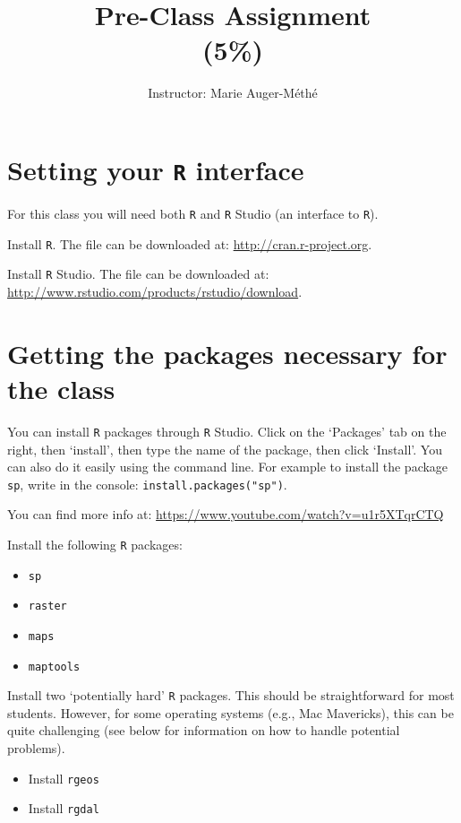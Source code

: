 \documentclass[11pt, oneside]{article}   	%
\title{Pre-Class Assignment \\ \large(5\%)}
\author{Instructor: Marie Auger-M\'eth\'e}
\date{}							%
\begin{document}
\maketitle

\section{Setting your \texttt{R} interface}

For this class you will need both \texttt{R} and \texttt{R} Studio (an interface to \texttt{R}).

\begin{Exercise}

\Question Install \texttt{R}. The file can be downloaded at: \url{http://cran.r-project.org}. 

\Question Install \texttt{R} Studio. The file can be downloaded at:
\url{http://www.rstudio.com/products/rstudio/download}. 

\end{Exercise}

\section{Getting the packages necessary for the class}

You can install \texttt{R} packages through \texttt{R} Studio. Click on the `Packages' tab on the right, then `install', then type the name of the package, then click `Install'. You can also do it easily using the command line.  For example to install the package \texttt{sp}, write in the console: \texttt{install.packages("sp")}.

You can find more info at: \url{https://www.youtube.com/watch?v=u1r5XTqrCTQ}

\begin{Exercise}[label=easyPackages]
\Question Install the following \texttt{R} packages:
\begin{itemize}
	\item \texttt{sp} 
	\item \texttt{raster} 
	\item \texttt{maps} 
	\item \texttt{maptools} 
\end{itemize}
\end{Exercise}

\begin{Exercise}

\Question Install two 	`potentially hard' \texttt{R} packages. This should be straightforward for most students. However, for some operating systems (e.g., Mac Mavericks), this can be quite challenging (see below for information on how to handle potential problems). 
\begin{itemize}
	\item Install \texttt{rgeos}	
	\item Install \texttt{rgdal}	
\end{itemize}
\end{Exercise}
\end{document}
